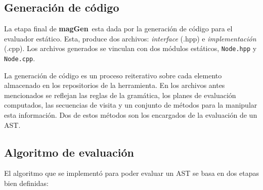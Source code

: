 \documentclass[runningheads,a4paper]{llncs}
\newcommand{\maggen}{\textbf{magGen}}
\begin{document}
\subsection{Generación de código}
\vspace{-0.22cm}
La etapa final de \maggen\ esta dada por la generación de código para el evaluador estático. Esta, produce dos archivos: \textit{interface} (.hpp) e \textit{implementación} (.cpp). Los archivos generados se vinculan con dos módulos estáticos, \texttt{Node.hpp} y \texttt{Node.cpp}.

La generación de código es un proceso reiterativo sobre cada elemento almacenado en los repositorios de la herramienta. En los archivos antes mencionados se reflejan las reglas de la gramática, los planes de evaluación computados, las secuencias de visita y un conjunto de métodos para la manipular esta información. Dos de estos métodos son los encargados de la evaluación de un AST.

\subsection{Algoritmo de evaluación}
\label{sec:codcppalgeval}
\vspace{-0.22cm}
El algoritmo que se implementó para poder evaluar un AST se basa en dos etapas bien definidas:
\end{document}
